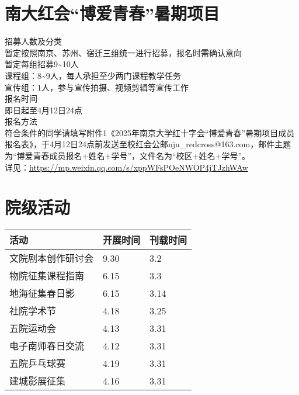 \documentclass[letterpaper, 12pt]{article}
\begin{document}
\begin{multicols}{2}
\section{南大红会“博爱青春”暑期项目}
招募人数及分类
\\暂定按照南京、苏州、宿迁三组统一进行招募，报名时需确认意向
\\暂定每组招募9\textasciitilde{}10人
\\课程组：8\textasciitilde{}9人，每人承担至少两门课程教学任务
\\宣传组：1人，参与宣传拍摄、视频剪辑等宣传工作‍‍‍‍
\\报名时间
\\即日起至4月12日24点
\\报名方法
\\符合条件的同学请填写附件1《2025年南京大学红十字会“博爱青春”暑期项目成员报名表》，于4月12日24点前发送至校红会公邮nju\_redcross@163.com，邮件主题为“博爱青春成员报名+姓名+学号”，文件名为“校区+姓名+学号”。\\
详见：\url{https://mp.weixin.qq.com/s/xppWFsPOeNWOP4jTJzhWAw}


\section{院级活动}
\begin{tabular}{|>{\centering\arraybackslash}m{}|m{}|m{}|}
\hline
    活动 & 开展时间 & 刊载时间\\
    \hline\hline
    文院剧本创作研讨会 & 9.30 & 3.2\\
    物院征集课程指南 & 6.15 & 3.3\\
    地海征集春日影 & 6.15 & 3.14\\
    社院学术节 & 4.18 & 3.25\\
    五院运动会 & 4.13 & 3.31\\
    电子南师春日交流 & 4.12 & 3.31\\
    五院乒乓球赛 & 4.19 & 3.31\\
    建城影展征集 & 4.16 & 3.31\\
    
    \hline
\end{tabular}


\end{multicols}
\end{document}
